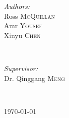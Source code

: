 \documentclass[12pt]{article}
\begin{document}
\begin{titlepage}
\begin{minipage}{0.4\textwidth}
\begin{flushleft} \large
\emph{Authors:}\\
Ross \textsc{McQuillan}\\
Amr \textsc{Yousef}\\
Xinyu \textsc{Chen}
\end{flushleft}
\end{minipage}
~
\begin{minipage}{0.4\textwidth}
\begin{flushright} \large
\emph{Supervisor:} \\
Dr. Qinggang \textsc{Meng} %
\end{flushright}
\end{minipage}\\[2cm]


\vfill %


{\large \today}\\[2cm] %
\restoregeometry
\end{titlepage}

\tableofcontents
\clearpage 
{}








\clearpage 


\end{document}
